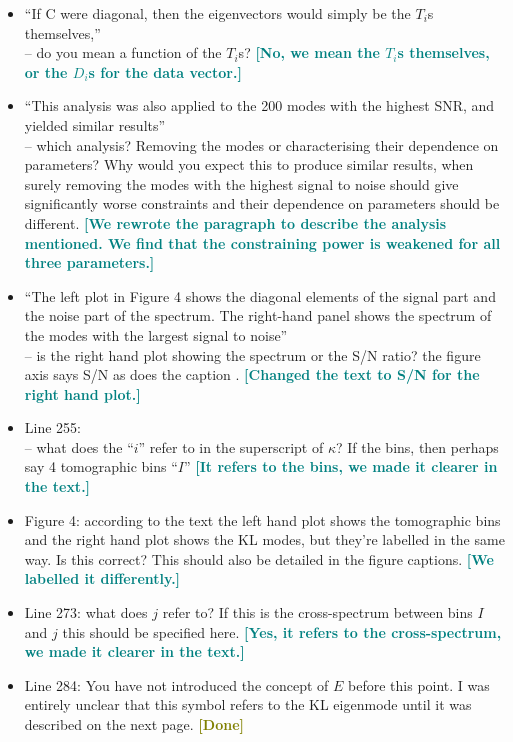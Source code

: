 \documentclass{article}
\newcommand\reply[1]{{\bf {\textcolor{teal}{[#1]}}}}
\newcommand\done{{\bf {\textcolor{olive}{[Done]}}}}
\begin{document}
\begin{itemize}
		\item “If C were diagonal, then the eigenvectors would simply be the $T_i$s themselves,” \\ 
		– do you mean a function of the $T_i$s? \reply{No, we mean the $T_i$s themselves, or the $D_i$s for the data vector.}
		
		\item “This analysis was also applied to the 200 modes with the highest SNR, and yielded similar results” \\ 
		– which analysis? Removing the modes or characterising their dependence on parameters? Why would you expect this to produce similar results, when surely removing the modes with the highest signal to noise should give significantly worse constraints and their dependence on parameters should be different. \reply{We rewrote the paragraph to describe the analysis mentioned. We find that the constraining power is weakened for all three parameters.}
		
		
		\item “The left plot in Figure 4 shows the diagonal elements of the signal part and the noise part of the spectrum. The right-hand panel shows the spectrum of the modes with the largest signal to noise” \\ 
		– is the right hand plot showing the spectrum or the S/N ratio? the figure axis says S/N as does the caption . \reply{Changed the text to S/N for the right hand plot.}
		
		\item Line 255: \\ 
		– what does the “$i$” refer to in the superscript of $\kappa$? If the bins, then perhaps say 4 tomographic bins “$I$” \reply{It refers to the bins, we made it clearer in the text.}
		
		\item Figure 4: according to the text the left hand plot shows the tomographic bins and the right hand plot shows the KL modes, but they’re labelled in the same way. Is this correct? This should also be detailed in the figure captions. \reply{We labelled it differently.}
		
		\item Line 273: what does $j$ refer to? If this is the cross-spectrum between bins $I$ and $j$ this should be specified here. \reply{Yes, it refers to the cross-spectrum, we made it clearer in the text.}
		
		\item Line 284: You have not introduced the concept of $E$ before this point. I was entirely unclear that this symbol refers to the KL eigenmode until it was described on the next page. \done
		

\end{itemize}
\end{document}
